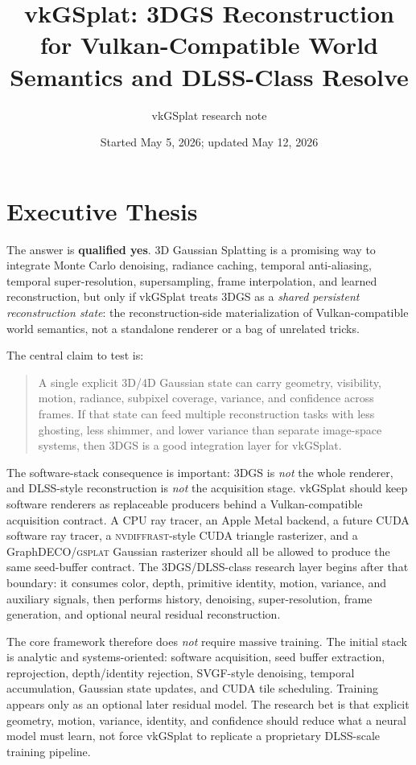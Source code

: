 \documentclass[11pt]{article}
\title{vkGSplat: 3DGS Reconstruction for Vulkan-Compatible World Semantics and DLSS-Class Resolve}
\author{vkGSplat research note}
\date{Started May 5, 2026; updated May 12, 2026}
\begin{document}
\maketitle

\section{Executive Thesis}

The answer is \textbf{qualified yes}. 3D Gaussian Splatting is a promising way
to integrate Monte Carlo denoising, radiance caching, temporal anti-aliasing,
temporal super-resolution, supersampling, frame interpolation, and learned
reconstruction, but only if vkGSplat treats 3DGS as a \emph{shared persistent
reconstruction state}: the reconstruction-side materialization of
Vulkan-compatible world semantics, not a standalone renderer or a bag of
unrelated tricks.

The central claim to test is:

\begin{quote}
A single explicit 3D/4D Gaussian state can carry geometry, visibility, motion,
radiance, subpixel coverage, variance, and confidence across frames. If that
state can feed multiple reconstruction tasks with less ghosting, less shimmer,
and lower variance than separate image-space systems, then 3DGS is a good
integration layer for vkGSplat.
\end{quote}

The software-stack consequence is important: 3DGS is \emph{not} the whole
renderer, and DLSS-style reconstruction is \emph{not} the acquisition stage.
vkGSplat should keep software renderers as replaceable producers behind a
Vulkan-compatible acquisition contract. A CPU ray tracer, an Apple Metal
backend, a future CUDA software ray tracer, a \textsc{nvdiffrast}-style CUDA
triangle rasterizer, and a GraphDECO/\textsc{gsplat} Gaussian rasterizer should
all be allowed to produce the same seed-buffer contract. The 3DGS/DLSS-class
research layer begins after that boundary: it consumes color, depth, primitive
identity, motion, variance, and auxiliary signals, then performs history,
denoising, super-resolution, frame generation, and optional neural residual
reconstruction.

The core framework therefore does \emph{not} require massive training. The
initial stack is analytic and systems-oriented: software acquisition, seed
buffer extraction, reprojection, depth/identity rejection, SVGF-style
denoising, temporal accumulation, Gaussian state updates, and CUDA tile
scheduling. Training appears only as an optional later residual model. The
research bet is that explicit geometry, motion, variance, identity, and
confidence should reduce what a neural model must learn, not force vkGSplat to
replicate a proprietary DLSS-scale training pipeline.
\end{document}
